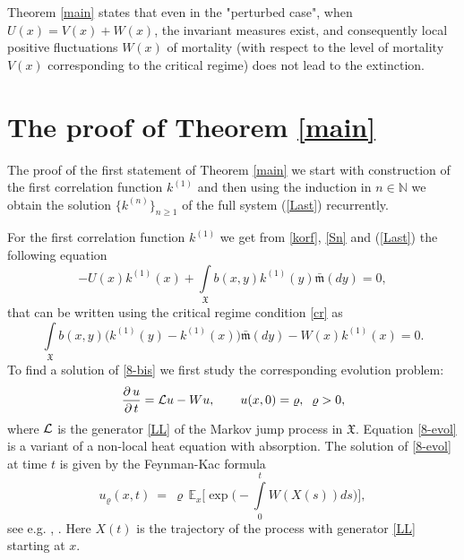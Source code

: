 \documentclass[a4paper,12pt]{article}
\newcommand{\N}{{\mathbb N}}
\newcommand{\XXX}{{\mathfrak{X}}}
\begin{document}
Theorem \ref{main} states that even in the "perturbed case", when $U(x) = V(x)+W(x)$, the invariant measures exist, and consequently local positive fluctuations $W(x)$ of mortality (with respect to the level of mortality $V(x)$ corresponding to the critical regime) does not lead to the extinction.



\section{The proof of Theorem \ref{main}}


The proof of the first statement of Theorem \ref{main} we start with construction of the first correlation function $k^{(1)}$ and then using the
induction in $n\in\N$ we obtain the solution $\{k^{(n)}\}_{n\geq 1}$ of the full system (\ref{Last}) recurrently.

For the first correlation function $k^{(1)}$ we get from \eqref{korf}, \eqref{Sn}  and (\ref{Last}) the following equation
\begin{equation}\label{8}
-U(x) k^{(1)}(x) + \int\limits_{\XXX} b(x,y) k^{(1)}(y) \bar{\mathfrak{m}}(dy) = 0,
\end{equation}
that can be written using the critical regime condition \eqref{cr}  as
\begin{equation}\label{8-bis}
\int\limits_{\XXX} b(x,y) \big( k^{(1)}(y)- k^{(1)}(x) \big) \bar{\mathfrak{m}}(dy) - W(x)k^{(1)}(x) = 0.
\end{equation}
To find a solution of \eqref{8-bis} we first study the corresponding evolution problem:
\begin{equation}\label{8-evol}
\frac{\partial \, u}{ \partial \, t} = {\cal L} u - W u, \qquad u(x,0)= \varrho, \; \; \varrho>0,
\end{equation}
where $ {\cal L}$ is the generator \eqref{LL} of the Markov jump process in $\XXX$. Equation \eqref{8-evol} is a variant of a non-local heat equation with absorption. The solution of \eqref{8-evol} at time $t$ is given by the Feynman-Kac formula
\begin{equation}\label{FK}
u_\varrho (x, t)\ = \ \varrho \, \mathbb{E}_x \big[ \exp \big(- \int\limits_0^t W(X(s)) ds \big) \big],
\end{equation}
see e.g.  \cite[Chapter III]{RW}, \cite[Chapter II]{Simon}. Here $X(t)$ is the trajectory of the process with generator \eqref{LL} starting at $x$.
\end{document}
